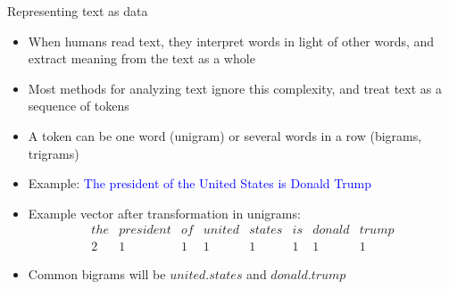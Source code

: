 \documentclass[english]{beamer}
\begin{document}
%



\begin{frame}{Representing text as data}

\begin{itemize}
\setlength{\itemsep}{0.8em}
\item When humans read text, they interpret words in light of other words, and extract meaning from the text as a whole

\pause

\item Most methods for analyzing text ignore this complexity, and treat text as a sequence of tokens

\pause

\item A token can be one word (unigram) or several words in a row (bigrams, trigrams)

\pause

\item Example: \textcolor{blue}{The president of the United States is Donald Trump}

\item Example vector after transformation in unigrams:
\begin{equation*}
\begin{array}{cccccccc}
the & president & of & united & states & is & donald & trump \\ 
2 & 1 & 1 & 1 & 1 & 1 & 1 & 1%
\end{array}%
\end{equation*}

\item Common bigrams will be $united.states$ and $donald.trump$
\end{itemize}
\end{frame}
\end{document}
